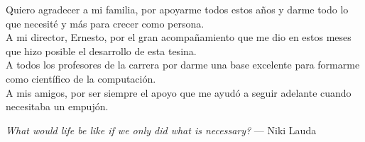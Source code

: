 Quiero agradecer a mi familia, por apoyarme todos estos años y darme todo lo que necesité y más para crecer como persona. \\

A mi director, Ernesto, por el gran acompañamiento que me dio en estos meses que hizo posible el desarrollo de esta tesina. \\

A todos los profesores de la carrera por darme una base excelente para formarme como científico de la computación. \\

A mis amigos, por ser siempre el apoyo que me ayudó a seguir adelante cuando necesitaba un empujón. \\
\vspace{1cm}

\begin{center}
	\textit{What would life be like if we only did what is necessary?} --- Niki Lauda
\end{center}

